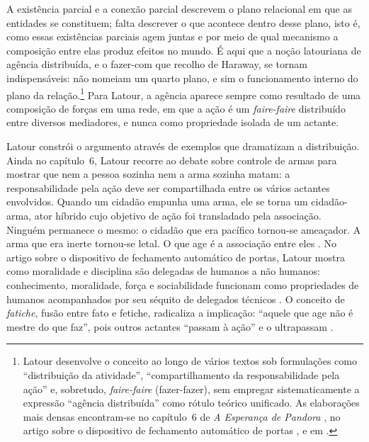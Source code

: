 A existência parcial e a conexão parcial descrevem o plano relacional em que as entidades se constituem; falta descrever o que acontece dentro desse plano, isto é, como essas existências parciais agem juntas e por meio de qual mecanismo a composição entre elas produz efeitos no mundo. É aqui que a noção latouriana de agência distribuída, e o fazer-com que recolho de Haraway, se tornam indispensáveis: não nomeiam um quarto plano, e sim o funcionamento interno do plano da relação.\footnote{Latour desenvolve o conceito ao longo de vários textos sob formulações como \enquote{distribuição da atividade}, \enquote{compartilhamento da responsabilidade pela ação} e, sobretudo, \textit{faire-faire} (fazer-fazer), sem empregar sistematicamente a expressão \enquote{agência distribuída} como rótulo teórico unificado. As elaborações mais densas encontram-se no capítulo~6 de \textit{A Esperança de Pandora} \parencite{Latour2017Esperanca}, no artigo sobre o dispositivo de fechamento automático de portas \parencite{johnson1988mixing}, e em \textcite{latour2010factish}.} Para Latour, a agência aparece sempre como resultado de uma composição de forças em uma rede, em que a ação é um \textit{faire-faire} distribuído entre diversos mediadores, e nunca como propriedade isolada de um actante.

Latour constrói o argumento através de exemplos que dramatizam a distribuição. Ainda no capítulo~6, Latour recorre ao debate sobre controle de armas para mostrar que nem a pessoa sozinha nem a arma sozinha matam: a responsabilidade pela ação deve ser compartilhada entre os vários actantes envolvidos. Quando um cidadão empunha uma arma, ele se torna um cidadão-arma, ator híbrido cujo objetivo de ação foi transladado pela associação. Ninguém permanece o mesmo: o cidadão que era pacífico tornou-se ameaçador. A arma que era inerte tornou-se letal. O que age é a associação entre eles \parencite{Latour2017Esperanca}. No artigo sobre o dispositivo de fechamento automático de portas, Latour mostra como moralidade e disciplina são delegadas de humanos a não humanos: conhecimento, moralidade, força e sociabilidade funcionam como propriedades de humanos acompanhados por seu séquito de delegados técnicos \parencite{johnson1988mixing}. O conceito de \textit{fatiche}, fusão entre fato e fetiche, radicaliza a implicação: \enquote{aquele que age não é mestre do que faz}, pois outros actantes \enquote{passam à ação} e o ultrapassam \parencite{latour2010factish}.

